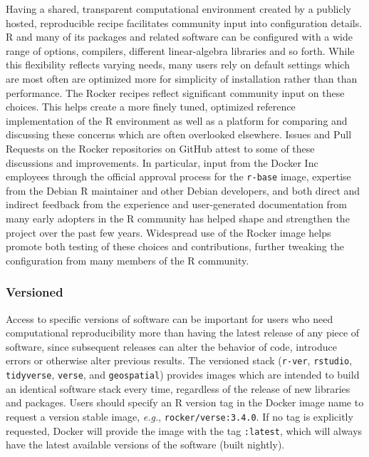 Having a shared, transparent computational environment created by a
publicly hosted, reproducible recipe facilitates community input into
configuration details. R and many of its packages and related software
can be configured with a wide range of options, compilers, different
linear-algebra libraries and so forth. While this flexibility reflects
varying needs, many users rely on default settings which are most often
are optimized more for simplicity of installation rather than than
performance. The Rocker recipes reflect significant community input on
these choices. This helps create a more finely tuned, optimized
reference implementation of the R environment as well as a platform for
comparing and discussing these concerns which are often overlooked
elsewhere. Issues and Pull Requests on the Rocker repositories on GitHub
attest to some of these discussions and improvements. In particular,
input from the Docker Inc employees through the official approval
process for the \texttt{r-base} image, expertise from the Debian R
maintainer and other Debian developers, and both direct and indirect
feedback from the experience and user-generated documentation from many
early adopters in the R community has helped shape and strengthen the
project over the past few years. Widespread use of the Rocker image
helps promote both testing of these choices and contributions, further
tweaking the configuration from many members of the R community.

\subsubsection{Versioned}\label{versioned}

Access to specific versions of software can be important for users who
need computational reproducibility more than having the latest release
of any piece of software, since subsequent releases can alter the
behavior of code, introduce errors or otherwise alter previous results.
The versioned stack (\texttt{r-ver}, \texttt{rstudio},
\texttt{tidyverse}, \texttt{verse}, and \texttt{geospatial}) provides
images which are intended to build an identical software stack every
time, regardless of the release of new libraries and packages. Users
should specify an R version tag in the Docker image name to request a
version stable image, \emph{e.g.}, \texttt{rocker/verse:3.4.0}. If no
tag is explicitly requested, Docker will provide the image with the tag
\texttt{:latest}, which will always have the latest available versions
of the software (built nightly).

